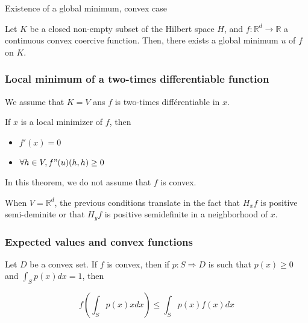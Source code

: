 \documentclass[
10pt, %
a4paper, %
oneside, %
headinclude,footinclude, %
BCOR5mm, %
]{scrartcl}
\begin{document}
\begin{theorem}{Existence of a global minimum, convex case}
    \label{th:alphaconv}

    Let $K$ be a closed non-empty subset of the Hilbert space $H$, and $f: \mathbb{R}^d\rightarrow \mathbb{R} $ a continuous convex coercive function. Then, there exists a global minimum $u$ of $f$ on $K$.

\end{theorem}

\subsubsection{\large\color{Periwinkle}Local minimum of a two-times differentiable function}

\begin{theorem}
    
We assume that $K=V$ ans $f$ is two-times différentiable in $x$.

If $x$ is a local minimizer of $f$, then
\begin{itemize}
    \item $f'(x)=0$
    \item $\forall h\in V, f"(u)(h,h)\geq 0$
\end{itemize}


\end{theorem}

\begin{remark}
    
    In this theorem, we do not assume that $f$ is convex.
\end{remark}

\begin{remark}
   When  $V= \mathbb{R}^d$, the previous conditions translate in the fact that $H_xf$ is positive semi-deminite or that $H_yf$ is positive semidefinite in a neighborhood of $x$. 
\end{remark}


\subsubsection{\large\color{Periwinkle}Expected values and convex functions}

Let $D$ be a convex set. If $f$ is convex, then if $p: S\Rightarrow D$ is such that $p(x)\geq 0$ and $ \int_{S} p(x)  dx =1$, then

\begin{equation*}
    f( \int_{S} p(x)x  dx)\leq \int_{S} p(x)f(x)  dx
\end{equation*}
\end{document}

